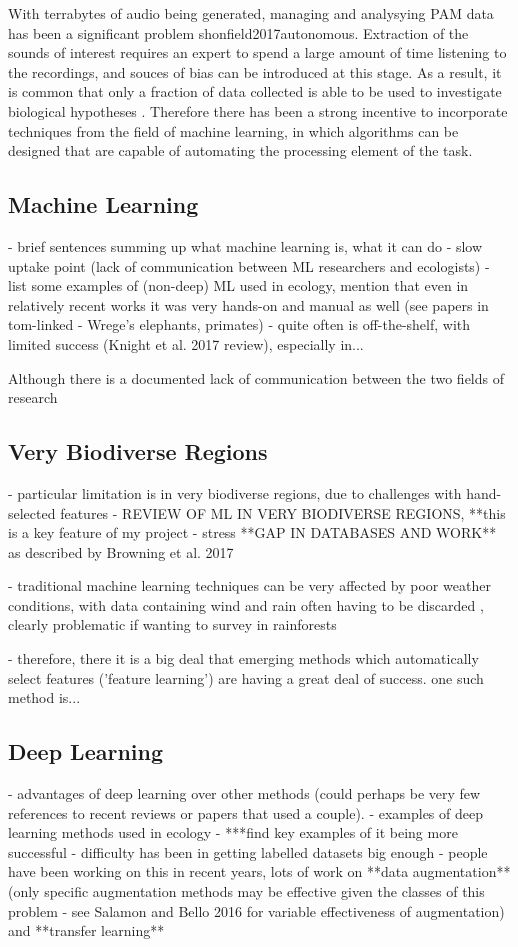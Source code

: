 \documentclass[11pt]{article}
\begin{document}
With terrabytes of audio being generated, managing and analysying PAM data has been a significant problem \citep{villanueva2012pumilio}{shonfield2017autonomous}. Extraction of the sounds of interest requires an expert to spend a large amount of time listening to the recordings, and souces of bias can be introduced at this stage. As a result, it is common that only a fraction of data collected is able to be used to investigate biological hypotheses \citep{kobayasi2012classification}. Therefore there has been a strong incentive to incorporate techniques from the field of machine learning, in which algorithms can be designed that are capable of automating the processing element of the task. 


\subsection{Machine Learning}
- brief sentences summing up what machine learning is, what it can do
- slow uptake point (lack of communication between ML researchers and ecologists)
- list some examples of (non-deep) ML used in ecology, mention that even in relatively recent works it was very hands-on and manual as well (see papers in tom-linked - Wrege's elephants, primates)
- quite often is off-the-shelf, with limited success (Knight et al. 2017 review), especially in...

Although there is a documented lack of communication between the two fields of research \citep{thessen2016adoption}

\subsection{Very Biodiverse Regions}
- particular limitation is in very biodiverse regions, due to challenges with hand-selected features
- REVIEW OF ML IN VERY BIODIVERSE REGIONS, **this is a key feature of my project
- stress **GAP IN DATABASES AND WORK** as described by Browning et al. 2017

- traditional machine learning techniques can be very affected by poor weather conditions, with data containing wind and rain often having to be discarded \citep{stowell2018automatic}, clearly problematic if wanting to survey in rainforests  

- therefore, there it is a big deal that emerging methods which automatically select features ('feature learning') are having a great deal of success. one such method is...

\subsection{Deep Learning}
- advantages of deep learning over other methods (could perhaps be very few references to recent reviews or papers that used a couple).  
- examples of deep learning methods used in ecology 
- ***find key examples of it being more successful
- difficulty has been in getting labelled datasets big enough
- people have been working on this in recent years, lots of work on **data augmentation** (only specific augmentation methods may be effective given the classes of this problem - see Salamon and Bello 2016 for variable effectiveness of augmentation) and **transfer learning**
\end{document}
